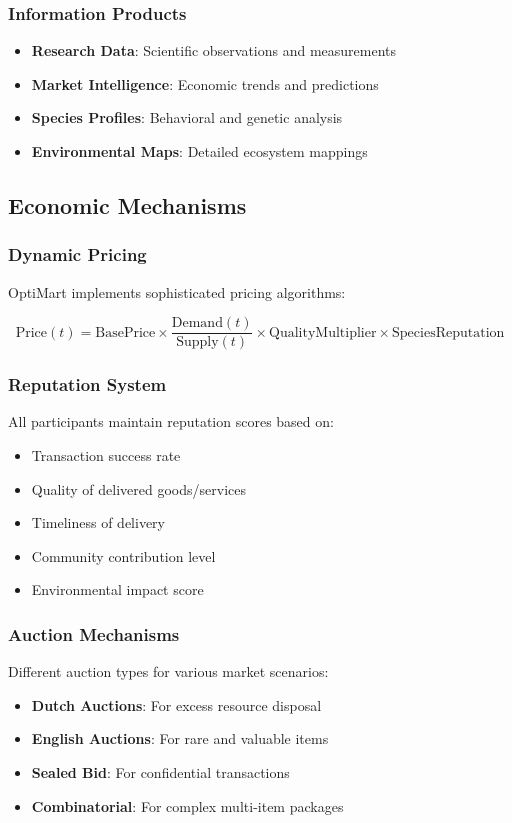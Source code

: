 \documentclass[11pt,a4paper]{article}
\begin{document}
\subsubsection{Information Products}
\begin{itemize}
    \item \textbf{Research Data}: Scientific observations and measurements
    \item \textbf{Market Intelligence}: Economic trends and predictions
    \item \textbf{Species Profiles}: Behavioral and genetic analysis
    \item \textbf{Environmental Maps}: Detailed ecosystem mappings
\end{itemize}

\subsection{Economic Mechanisms}

\subsubsection{Dynamic Pricing}
OptiMart implements sophisticated pricing algorithms:

\begin{equation}
\text{Price}(t) = \text{BasePrice} \times \frac{\text{Demand}(t)}{\text{Supply}(t)} \times \text{QualityMultiplier} \times \text{SpeciesReputation}
\end{equation}

\subsubsection{Reputation System}
All participants maintain reputation scores based on:
\begin{itemize}
    \item Transaction success rate
    \item Quality of delivered goods/services
    \item Timeliness of delivery
    \item Community contribution level
    \item Environmental impact score
\end{itemize}

\subsubsection{Auction Mechanisms}
Different auction types for various market scenarios:
\begin{itemize}
    \item \textbf{Dutch Auctions}: For excess resource disposal
    \item \textbf{English Auctions}: For rare and valuable items
    \item \textbf{Sealed Bid}: For confidential transactions
    \item \textbf{Combinatorial}: For complex multi-item packages
\end{itemize}
\end{document}
